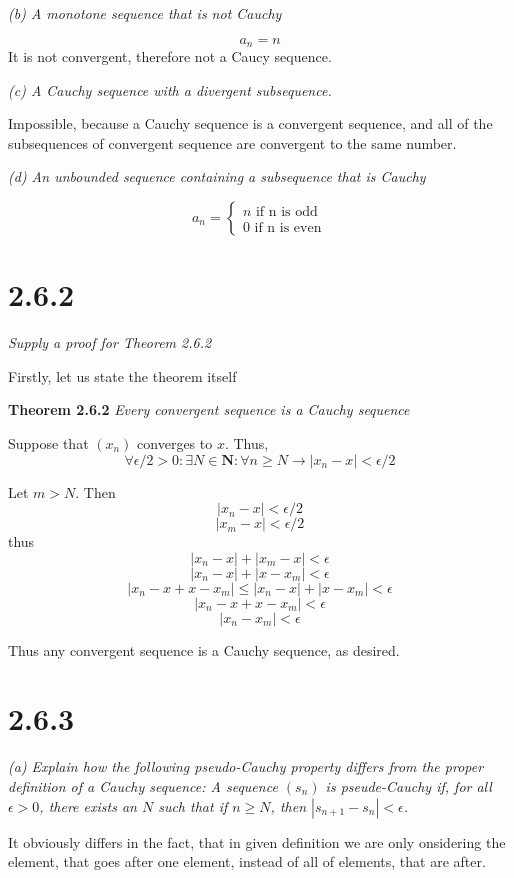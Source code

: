 \documentclass[11pt,oneside,titlepage]{book}
\begin{document}
\textit{(b) A monotone sequence that is not Cauchy}

$$a_n = n$$
It is not convergent, therefore not a Caucy sequence.

\textit{(c) A Cauchy sequence with a divergent subsequence.}

Impossible, because a Cauchy sequence is a convergent sequence, and
all of the subsequences of convergent sequence are convergent to the
same number.

\textit{(d) An unbounded sequence containing a subsequence that is Cauchy}

\begin{equation}
  a_n =
  \begin{cases}
    n \text{ if n is odd } \\
    0 \text{ if n is even}
  \end{cases}
\end{equation}

\section*{2.6.2}
\textit{Supply a proof for Theorem 2.6.2}

Firstly, let us state the theorem itself

\textbf{Theorem 2.6.2}
\textit{Every convergent sequence is a Cauchy sequence}

Suppose that $(x_n)$ converges to $x$. Thus,
$$\forall \epsilon/2 > 0: \exists N \in \textbf{N}: \forall n \geq N \to
|x_n - x| < \epsilon/2$$

Let $m > N$. Then
$$|x_n - x| < \epsilon/2$$
$$|x_m - x| < \epsilon/2$$
thus
$$|x_n - x| + |x_m - x| < \epsilon$$
$$|x_n - x| + |x - x_m| < \epsilon$$
$$|x_n - x + x - x_m| \leq |x_n - x| + |x - x_m| < \epsilon$$
$$|x_n - x + x - x_m| < \epsilon$$
$$|x_n - x_m| < \epsilon$$

Thus any convergent sequence is a Cauchy sequence, as desired.

\section*{2.6.3}
\textit{(a) Explain how the following pseudo-Cauchy property differs
  from the proper definition of a Cauchy sequence: A sequence $(s_n)$ is
  pseude-Cauchy if, for all $\epsilon > 0$, there exists an $N$ such that
  if $n \geq N$, then $|s_{n + 1} - s_n| < \epsilon$.}

It obviously differs in the fact, that in given definition we are only
onsidering the element, that goes after one element, instead of
all of elements, that are after.
\end{document}
